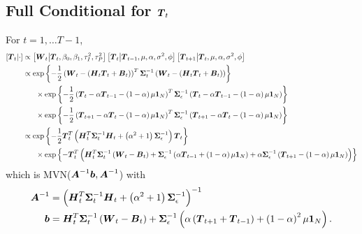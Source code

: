 \documentclass{article}\usepackage[]{graphicx}\usepackage[]{color}
\def\bm#1{\mbox{\boldmath $#1$}}
\begin{document}
\subsection{Full Conditional for $\bm{T}_t$}
%
For $t = 1, \ldots T - 1$,
%
\begin{align*}
%
\left[ \bm{T}_t \middle| \cdot \right] & \propto \left[ \bm{W}_t \middle| \bm{T}_t, \beta_0, \beta_1, \tau^2_I, \tau^2_P \right] \left[ \bm{T}_t \middle| \bm{T}_{t - 1}, \mu, \alpha, \sigma^2, \phi \right] \left[ \bm{T}_{t + 1} \middle| \bm{T}_t, \mu, \alpha, \sigma^2, \phi \right]\\
%
& \propto \exp{ \left\{ - \frac{1} {2} \left( \bm{W}_t - \left( \bm{H}_t \bm{T}_t + \bm{B}_t \right) \right)^T \bm{\Sigma}_t^{ - 1} \left( \bm{W}_t - \left( \bm{H}_t \bm{T}_t + \bm{B}_t \right)  \right) \right\} }\\
& \hspace{6mm} \times \exp{ \left\{ - \frac{1} {2} \left( \bm{T}_t - \alpha \bm{T}_{t - 1} - \left( 1 - \alpha \right) \mu \bm{1}_N \right)^T \bm{\Sigma}_\epsilon^{ - 1} \left( \bm{T}_t - \alpha \bm{T}_{t - 1} - \left( 1 - \alpha \right) \mu \bm{1}_N \right) \right\} }\\
& \hspace{6mm} \times \exp{ \left\{ - \frac{1} {2} \left( \bm{T}_{t + 1} - \alpha \bm{T}_t - \left( 1 - \alpha \right) \mu \bm{1}_N \right)^T \bm{\Sigma}_\epsilon^{ - 1} \left( \bm{T}_{t + 1} - \alpha \bm{T}_t - \left( 1 - \alpha \right) \mu \bm{1}_N \right) \right\} }\\
%
& \propto \exp{ \left\{ - \frac{1} {2} \bm{T}_t^T \left( \bm{H}_t^T \bm{\Sigma}_t^{ - 1} \bm{H}_t + \left( \alpha^2 + 1 \right) \bm{\Sigma}_\epsilon^{ - 1} \right) \bm{T}_t \right\} }\\
& \hspace{6mm} \times \exp{ \left\{ - \bm{T}_t^T \left( \bm{H}_t^T \bm{\Sigma}_t^{ - 1} \left( \bm{W}_t - \bm{B}_t \right) + \bm{\Sigma}_\epsilon^{ - 1} \left( \alpha \bm{T}_{t - 1} + \left( 1 - \alpha \right) \mu \bm{1}_N \right) + \alpha \bm{\Sigma}_\epsilon^{ - 1} \left( \bm{T}_{t + 1} - \left( 1 - \alpha \right) \mu \bm{1}_N \right) \right) \right\} }
%
\end{align*}
%
which is MVN($\bm{A}^{ - 1}\bm{b}, \bm{A}^{ - 1}$) with \\
%
\begin{align*}
%
\bm{A}^{ - 1} & = \left( \bm{H}_t^T \bm{\Sigma}_t^{ - 1} \bm{H}_t + \left( \alpha^2 + 1 \right) \bm{\Sigma}_\epsilon^{ - 1} \right)^{ - 1} \\ 
%
\bm{b} & = \bm{H}_t^T \bm{\Sigma}_t^{ - 1} \left( \bm{W}_t - \bm{B}_t \right) + \bm{\Sigma}_\epsilon^{ - 1} \left( \alpha \left( \bm{T}_{t + 1} + \bm{T}_{t - 1} \right) + \left( 1 - \alpha \right)^2 \mu \bm{1}_N \right).\\
%
\end{align*}
\end{document}
